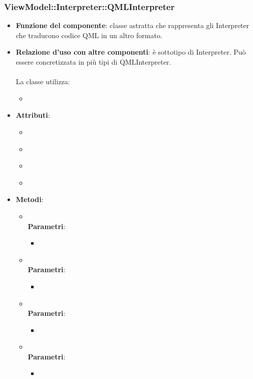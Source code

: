 \subsubsection{ViewModel::Interpreter::QMLInterpreter}
\begin{itemize}
\item\textbf{Funzione del componente}: classe astratta che rappresenta gli Interpreter che traducono codice QML in un altro formato.
	\item\textbf{Relazione d'uso con altre componenti}: è sottotipo di Interpreter. Può essere concretizzata in più tipi di QMLInterpreter.\\ \\
La classe utilizza:
	\begin{itemize}
		\item
	\end{itemize}
\item\textbf{Attributi}:
	\begin{itemize}
		\item\code{}\\
		\item\code{}\\
		\item\code{}\\
		\item\code{}\\
	\end{itemize}
\item\textbf{Metodi}:
	\begin{itemize}
		\item\code{}\\
		\textbf{Parametri}:
			\begin{itemize}
				\item\code{}\\
			\end{itemize}
		\item\code{}\\
		\textbf{Parametri}:
			\begin{itemize}
				\item\code{}\\
			\end{itemize}
		\item\code{}\\
		\textbf{Parametri}:
			\begin{itemize}
				\item\code{}\\
			\end{itemize}
		\item\code{}\\
		\textbf{Parametri}:
			\begin{itemize}
				\item\code{}\\
			\end{itemize}
	\end{itemize}
\end{itemize}

